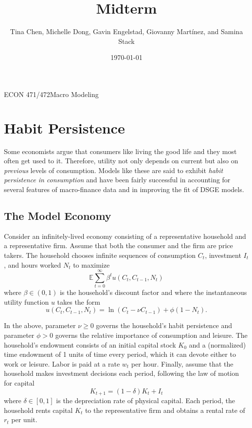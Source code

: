 \documentclass[11pt]{article}
\title{Midterm}
\author{Tina Chen, Michelle Dong, Gavin Engelstad, Giovanny Martínez, and Samina Stack}
\date{\today}
\numberwithin{equation}{section} %
\numberwithin{figure}{section} %
\numberwithin{table}{section} %
\theoremstyle{definition}
\newcommand{\E}{\mathbb{E}}
\newcommand{\theclass}{Macro Modeling}
\newcommand{\theclassnum}{ECON 471/472}
\begin{document}
\noindent
{\theclassnum \hfill  \theclass}\break

\begin{center}
	{\huge \textbf{\thetitle}}
 
    \theauthor
\end{center}

\section{Habit Persistence}

Some economists argue that consumers like living the good life and they most often get used to it. Therefore, utility not only depends on current but also on \emph{previous} levels of consumption. Models like these are said to exhibit \emph{habit persistence in consumption} and have been fairly successful in accounting for several features of macro-finance data and in improving the fit of DSGE models.


\subsection{The Model Economy}

Consider an infinitely-lived economy consisting of a representative household and a representative firm. Assume that both the consumer and the firm are price takers. The household chooses infinite sequences of consumption $C_t$, investment $I_t$, and hours worked $N_t$ to maximize
\[
    \E \sum_{t=0}^\infty \beta^t u(C_t, C_{t-1}, N_t)
\]
where $\beta \in (0, 1)$ is the household's discount factor and where the instantaneous utility function $u$ takes the form
\[
    u(C_t, C_{t-1}, N_t) = \ln \left(C_t - \nu C_{t-1}\right) + \phi \left(1 - N_t\right).
\]

In the above, parameter $\nu \geq 0$ governs the household's habit persistence and parameter $\phi > 0$ governs the relative importance of consumption and leisure. The household's endowment consists of an initial capital stock $K_0$ and a (normalized) time endowment of 1 units of time every period, which it can devote either to work or leisure. Labor is paid at a rate $w_t$ per hour. Finally, assume that the household makes investment decisions each period, following the law of motion for capital
\[
    K_{t + 1} = (1 - \delta)K_t + I_t
\]
where $\delta \in [0, 1]$ is the depreciation rate of physical capital. Each period, the household rents capital $K_t$ to the representative firm and obtains a rental rate of $r_t$ per unit.
\end{document}
